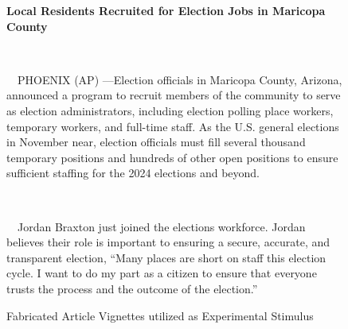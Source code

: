 \documentclass[
  11pt,
  a4paper,
]{article}
\begin{document}
\begin{figure}
\begin{minipage}{0.50\linewidth}
{\textbf{Local Residents Recruited for Election Jobs in Maricopa
County}\\
\strut \\
\strut ~~PHOENIX (AP) ---Election officials in Maricopa County, Arizona,
announced a program to recruit members of the community to serve as
election administrators, including election polling place workers,
temporary workers, and full-time staff. As the U.S. general elections in
November near, election officials must fill several thousand temporary
positions and hundreds of other open positions to ensure sufficient
staffing for the 2024 elections and beyond.\\
\strut \\
\strut ~~Jordan Braxton just joined the elections workforce. Jordan
believes their role is important to ensuring a secure, accurate, and
transparent election, ``Many places are short on staff this election
cycle. I want to do my part as a citizen to ensure that everyone trusts
the process and the outcome of the election.''

}


\end{minipage}%

\caption{\label{fig-vignettes}Fabricated Article Vignettes utilized as
Experimental Stimulus}

\end{figure}%
\end{document}
